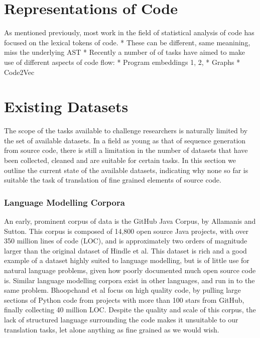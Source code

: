 \section{Representations of Code}

As mentioned previously, most work in the field of statistical analysis of code has focused on the lexical tokens of code. 
* These can be different, same meanining, miss the underlying AST
* Recently a number of of tasks have aimed to make use of different aspects of code flow:
* Program embeddings 1, 2, 
* Graphs
* Code2Vec

\section{Existing Datasets}

The scope of the tasks available to challenge researchers is naturally limited by the set of available datasets.
In a field as young as that of sequence generation from source code, there is still a limitation in the number of datasets that have been collected, cleaned and are suitable for certain tasks.
In this section we outline the current state of the available datasets, indicating why none so far is suitable the task of translation of fine grained elements of source code.

\subsubsection{Language Modelling Corpora}
An early, prominent corpus of data is the GitHub Java Corpus, by Allamanis and Sutton\cite{allamanis_mining_2013}. This corpus is composed of 14,800 open source Java projects, with over 350 million lines of code (LOC), and is approximately two orders of magnitude larger than the original dataset of Hindle et al. This dataset is rich and a good example of a dataset highly suited to language modelling, but is of little use for natural language problems, given how poorly documented much open source code is.
Similar language modelling corpora exist in other languages, and run in to the same problem. Bhoopchand et al \cite{bhoopchand_learning_2016} focus on high quality code, by pulling large sections of Python code from projects with more than 100 stars from GitHub, finally collecting 40 million LOC. 
Despite the quality and scale of this corpus, the lack of structured language surrounding the code makes it unsuitable to our translation tasks, let alone anything as fine grained as we would wish.

